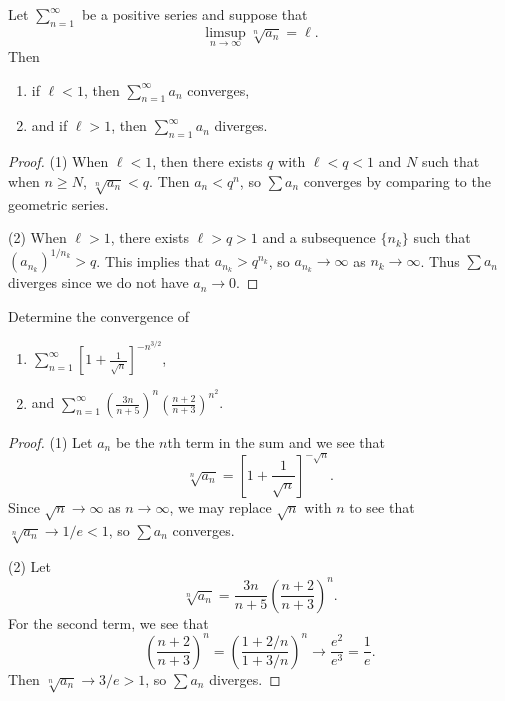 \begin{theorem}
  Let $\sum_{n = 1}^\infty$ be a positive series and
  suppose that
  \[\limsup_{n \to \infty} \sqrt[n]{a_n} = \ell.\]
  Then
  \begin{enumerate}
    \item if $\ell < 1$, then $\sum_{n = 1}^\infty a_n$ converges,
    \item and if $\ell > 1$, then $\sum_{n = 1}^\infty a_n$ diverges.
  \end{enumerate}
\end{theorem}

\begin{proof}
  (1) When $\ell < 1$, then there exists $q$ with
  $\ell < q < 1$ and $N$ such that when $n \ge N$,
  $\sqrt[n]{a_n} < q$. Then $a_n < q^n$,
  so $\sum a_n$ converges by comparing to the
  geometric series.

  (2) When $\ell > 1$, there exists $\ell > q > 1$ and
  a subsequence $\{n_k\}$ such that
  $(a_{n_k})^{1 / n_k} > q$. This implies that
  $a_{n_k} > q^{n_k}$, so $a_{n_k} \to \infty$ as
  $n_k \to \infty$. Thus $\sum a_n$ diverges since
  we do not have $a_n \to 0$.
\end{proof}

\begin{example}
  Determine the convergence of
  \begin{enumerate}
    \item $\displaystyle \sum_{n =1 }^\infty \left[1 + \frac{1}{\sqrt{n}}\right]^{-n^{3 / 2}}$,
    \item and $\displaystyle \sum_{n = 1}^\infty \left(\frac{3n}{n + 5}\right)^n \left(\frac{n + 2}{n + 3}\right)^{n^2}$.
  \end{enumerate}
\end{example}

\begin{proof}
  (1) Let $a_n$ be the $n$th term in the sum and we
  see that
  \[
    \sqrt[n]{a_n} =
    \left[1 + \frac{1}{\sqrt{n}}\right]^{-\sqrt{n}}.
  \]
  Since $\sqrt{n} \to \infty$ as $n \to \infty$, we
  may replace $\sqrt{n}$ with $n$ to see that
  $\sqrt[n]{a_n} \to 1 / e < 1$, so
  $\sum a_n$ converges.

  (2) Let
  \[
    \sqrt[n]{a_n} = \frac{3n}{n + 5} \left(\frac{n + 2}{n + 3}\right)^n.
  \]
  For the second term, we see that
  \[
    \left(\frac{n + 2}{n + 3}\right)^n
    = \left(\frac{1 + 2 / n}{1 + 3 / n}\right)^n
    \longrightarrow \frac{e^2}{e^3} = \frac{1}{e}.
  \]
  Then $\sqrt[n]{a_n} \to 3 / e > 1$, so
  $\sum a_n$ diverges.
\end{proof}
